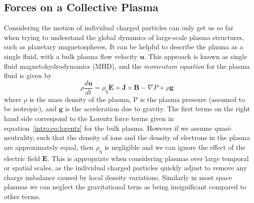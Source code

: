 \subsection{Forces on a Collective Plasma}\label{intro:sec:plasmaforces}
Considering the motion of individual charged particles can only get us so far when trying to understand the global dynamics of large-scale plasma structures, such as planetary magnetospheres. It can be helpful to describe the plasma as a single fluid, with a bulk plasma flow velocity $\boldsymbol{u}$. This approach is known as single fluid magnetohydrodynamics (MHD), and the \textit{momentum equation} for the plasma fluid is given by
\begin{equation}\label{intro:eq:momentum}
\rho\frac{d\boldsymbol{u}}{dt} = \rho_\mathrm{q}\boldsymbol{E} + \boldsymbol{J}\times\boldsymbol{B} - \nabla P + \rho \boldsymbol{g}
\end{equation}
where $\rho$ is the mass density of the plasma, P is the plasma pressure (assumed to be isotropic), and $\boldsymbol{g}$ is the acceleration due to gravity. The first terms on the right hand side correspond to the Lorentz force terms given in equation~\ref{intro:eq:lorentz} for the bulk plasma. However if we assume quasi-neutrality, such that the density of ions and the density of electrons in the plasma are approximately equal, then $\rho_\mathrm{q}$ is negligible and we can ignore the effect of the electric field $\boldsymbol{E}$. This is appropriate when considering plasmas over large temporal or spatial scales, as the individual charged particles quickly adjust to remove any charge imbalance caused by local density variations. Similarly in most space plasmas we can neglect the gravitational term as being insignificant compared to other terms.

